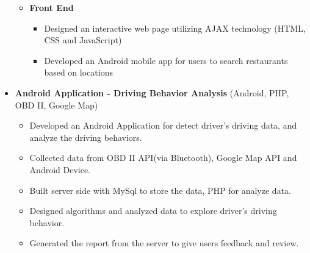 \documentclass[letterpaper,10pt]{article}
\begin{document}
\begin{itemize}
\begin{itemize}[topsep=-1em]
		\item[] \textbf{Front End}
			\begin{itemize}[topsep=-1em]
				\item[\textbullet] Designed an interactive web page utilizing AJAX technology (HTML, CSS and JavaScript)
				\item[\textbullet] Developed an Android mobile app for users to search restaurants based on locations
			\end{itemize}
	\end{itemize}
	
	
	
	\item [] \textbf{Android Application -  Driving Behavior Analysis} (Android, PHP, OBD II, Google Map)
	\setlength\itemsep{0em}
	
	\begin{itemize}[topsep=-1em]
	\setlength\itemindent{-0.25in}  %
	\setlength\itemsep{-0.1em} %
		\item [\textbullet]Developed an Android Application for detect driver\rq s driving data, and analyze the driving behaviors.
		\item [\textbullet]Collected data from OBD II API(via Bluetooth), Google Map API and Android Device. 
		\item [\textbullet]Built server side with MySql to store the data, PHP for analyze data.
		\item [\textbullet]Designed algorithms and analyzed data to explore driver\rq s driving behavior.
		\item [\textbullet]Generated the report from the server to give users feedback and review.
	\end{itemize}
	
	
	
	

\end{itemize}
\end{document}
